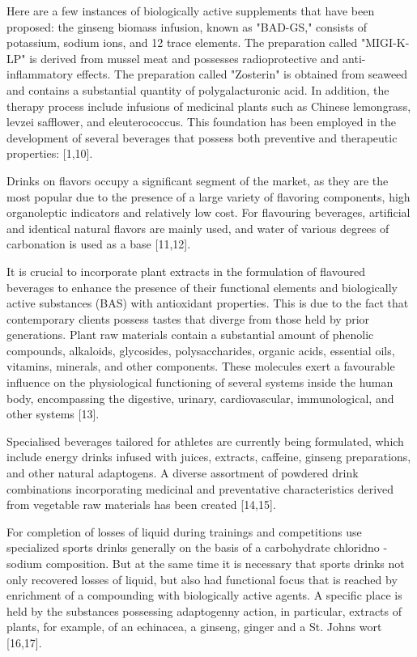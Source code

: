 Here are a few instances of biologically active supplements that have
been proposed: the ginseng biomass infusion, known as "BAD-GS," consists
of potassium, sodium ions, and 12 trace elements. The preparation called
"MIGI-K-LP" is derived from mussel meat and possesses radioprotective
and anti-inflammatory effects. The preparation called "Zosterin" is
obtained from seaweed and contains a substantial quantity of
polygalacturonic acid. In addition, the therapy process include
infusions of medicinal plants such as Chinese lemongrass, levzei
safflower, and eleuterococcus. This foundation has been employed in the
development of several beverages that possess both preventive and
therapeutic properties: {[}1,10{]}.

Drinks on flavors occupy a significant segment of the market, as they
are the most popular due to the presence of a large variety of flavoring
components, high organoleptic indicators and relatively low cost. For
flavouring beverages, artificial and identical natural flavors are
mainly used, and water of various degrees of carbonation is used as a
base {[}11,12{]}.

It is crucial to incorporate plant extracts in the formulation of
flavoured beverages to enhance the presence of their functional elements
and biologically active substances (BAS) with antioxidant properties.
This is due to the fact that contemporary clients possess tastes that
diverge from those held by prior generations. Plant raw materials
contain a substantial amount of phenolic compounds, alkaloids,
glycosides, polysaccharides, organic acids, essential oils, vitamins,
minerals, and other components. These molecules exert a favourable
influence on the physiological functioning of several systems inside the
human body, encompassing the digestive, urinary, cardiovascular,
immunological, and other systems {[}13{]}.~

Specialised beverages tailored for athletes are currently being
formulated, which include energy drinks infused with juices, extracts,
caffeine, ginseng preparations, and other natural adaptogens. A diverse
assortment of powdered drink combinations incorporating medicinal and
preventative characteristics derived from vegetable raw materials has
been created {[}14,15{]}.

For completion of losses of liquid during trainings and competitions use
specialized sports drinks generally on the basis of a carbohydrate
chloridno - sodium composition. But at the same time it is necessary
that sports drinks not only recovered losses of liquid, but also had
functional focus that is reached by enrichment of a compounding with
biologically active agents. A specific place is held by the substances
possessing adaptogenny action, in particular, extracts of plants, for
example, of an echinacea, a ginseng, ginger and a St.
John\textquotesingle s wort {[}16,17{]}.

